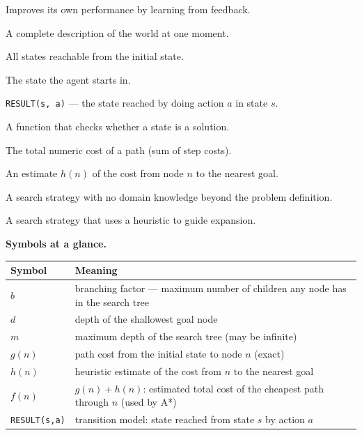 \documentclass[a4paper,11pt]{article}
\begin{document}
\begin{description}[leftmargin=8.5em,style=nextline,font=\normalfont\bfseries\color{navy}]
  \item[learning agent] Improves its own performance by learning from feedback.
  \item[state] A complete description of the world at one moment.
  \item[state space] All states reachable from the initial state.
  \item[initial state] The state the agent starts in.
  \item[transition model] \texttt{RESULT(s, a)} --- the state reached by doing action $a$ in state $s$.
  \item[goal test] A function that checks whether a state is a solution.
  \item[path cost] The total numeric cost of a path (sum of step costs).
  \item[heuristic] An estimate $h(n)$ of the cost from node $n$ to the nearest goal.
  \item[uninformed search] A search strategy with no domain knowledge beyond the problem definition.
  \item[informed search] A search strategy that uses a heuristic to guide expansion.
\end{description}

\medskip
\noindent\textbf{Symbols at a glance.}
\begin{center}\small
\begin{tabular}{@{}p{3.2cm}p{10cm}@{}}
\toprule
\textbf{Symbol} & \textbf{Meaning} \\
\midrule
$b$ & branching factor --- maximum number of children any node has in the search tree \\
$d$ & depth of the shallowest goal node \\
$m$ & maximum depth of the search tree (may be infinite) \\
$g(n)$ & path cost from the initial state to node $n$ (exact) \\
$h(n)$ & heuristic estimate of the cost from $n$ to the nearest goal \\
$f(n)$ & $g(n) + h(n)$: estimated total cost of the cheapest path through $n$ (used by A*) \\
\texttt{RESULT(s,a)} & transition model: state reached from state $s$ by action $a$ \\
\bottomrule
\end{tabular}
\end{center}
\end{document}
